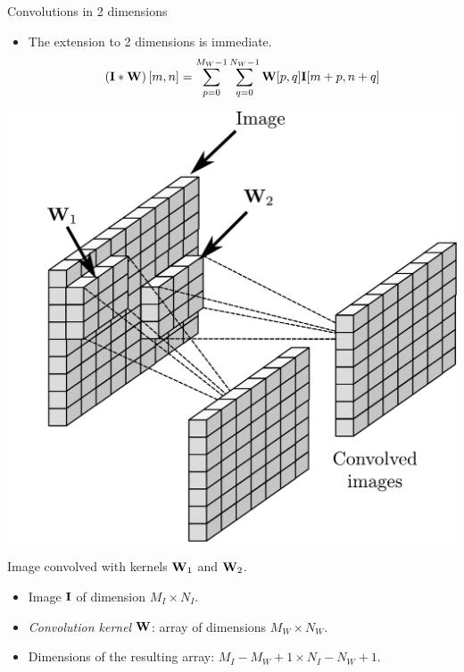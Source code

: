 \documentclass{beamer}
\begin{document}
\begin{frame}{Convolutions in 2 dimensions}
\begin{itemize}
    \item The extension to 2 dimensions is immediate. 
    \begin{equation}\label{eq:2Dconvolution}
    \left({\bf I}*{\bf W}\right)[m,n] = \sum_{p=0}^{M_W-1} \sum_{q=0}^{N_W-1} {\bf W}[p,q]{\bf I}[m+p,n+q]
\end{equation}
\end{itemize} 
\begin{multicols*}{2}
\includegraphics[scale=0.2]{Module 4 (CNN)/pics/CONVOLUTION1.pdf}
\begin{tiny}Image convolved with kernels ${\bf W}_1$ and ${\bf W}_2$.\end{tiny}

\columnbreak

\vspace*{1pt}

\begin{itemize}
\item Image ${\bf I}$ of dimension $M_I\times N_I$.
\item \emph{Convolution kernel} ${\bf W}$: array of dimensions $M_W\times N_W$.
\item Dimensions of the resulting array: $M_I-M_W+1 \times N_I-N_W +1$. 
\end{itemize}
\end{multicols*}
\end{frame}
\end{document}
